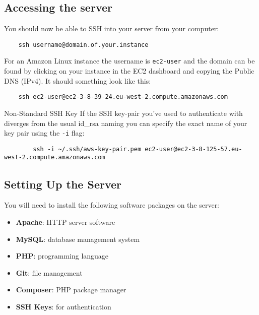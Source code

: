 \subsection{Accessing the server}

You should now be able to SSH into your server from your computer:

\begin{verbatim}
    ssh username@domain.of.your.instance
\end{verbatim}

For an Amazon Linux instance the username is \texttt{ec2-user} and the domain can be found by clicking on your instance in the EC2 dashboard and copying the Public DNS (IPv4). It should something look like this:

\begin{verbatim}
    ssh ec2-user@ec2-3-8-39-24.eu-west-2.compute.amazonaws.com
\end{verbatim}

\begin{infobox}{Non-Standard SSH Key}
    If the SSH key-pair you've used to authenticate with diverges from the usual id\_rsa naming you can specify the exact name of your key pair using the \texttt{-i} flag:

    \begin{verbatim}
        ssh -i ~/.ssh/aws-key-pair.pem ec2-user@ec2-3-8-125-57.eu-west-2.compute.amazonaws.com
    \end{verbatim}
\end{infobox}

\pagebreak

\subsection{Setting Up the Server}

You will need to install the following software packages on the server:

\begin{itemize}
    \item \textbf{Apache}: HTTP server software
    \item \textbf{MySQL}: database management system
    \item \textbf{PHP}: programming language
    \item \textbf{Git}: file management
    \item \textbf{Composer}: PHP package manager
    \item \textbf{SSH Keys}: for authentication
\end{itemize}

